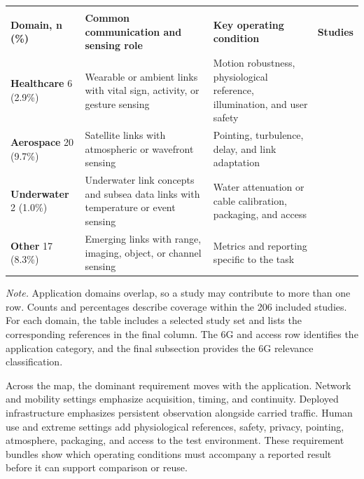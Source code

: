 \begin{table}[!t]
\vspace{3pt}
\begin{tabularx}{\textwidth}{@{}
>{\raggedright\arraybackslash}p{}
>{\raggedright\arraybackslash}p{}
>{\raggedright\arraybackslash}X
>{\centering\arraybackslash}p{}@{}}
\toprule
\multicolumn{4}{@{}l}{\emph{Human use, extreme settings, and remaining domains}} \\
\addlinespace[1pt]
\textbf{Domain, n (\%)} & \textbf{Common communication and sensing role} &
\textbf{Key operating condition} & \textbf{Studies} \\
\midrule
\textbf{Healthcare} 6 (2.9\%) & Wearable or ambient links with vital sign,
activity, or gesture sensing & Motion robustness, physiological reference,
illumination, and user safety & \cite{OISAC_SCR00001,OISAC_SCR00376} \\
\addlinespace[1.25pt]
\textbf{Aerospace} 20 (9.7\%) & Satellite links with atmospheric or wavefront
sensing & Pointing, turbulence, delay, and link adaptation &
\cite{OISAC_SCR00456} \\
\addlinespace[1.25pt]
\textbf{Underwater} 2 (1.0\%) & Underwater link concepts and subsea data links
with temperature or event sensing & Water attenuation or cable calibration,
packaging, and access & \cite{OISAC_SCR00763,OISAC_SCR01095} \\
\addlinespace[1.25pt]
\textbf{Other} 17 (8.3\%) & Emerging links with range, imaging, object, or
channel sensing & Metrics and reporting specific to the task & \cite{OISAC_SCR00953} \\
\bottomrule
\end{tabularx}
\vspace{1pt}
\parbox{\textwidth}{\raggedright\footnotesize\emph{Note.} Application domains
overlap, so a study may contribute to more than one row. Counts and percentages
describe coverage within the 206 included studies. For each domain, the table
includes a selected study set and lists the corresponding references in the
final column. The 6G and access row identifies the application category, and
the final subsection provides the 6G relevance classification.\par}
\end{table}

Across the map, the dominant requirement moves with the application. Network
and mobility settings emphasize acquisition, timing, and continuity. Deployed
infrastructure emphasizes persistent observation alongside carried traffic.
Human use and extreme settings add physiological references, safety,
privacy, pointing, atmosphere, packaging, and access to the test environment.
These requirement bundles show which operating conditions must accompany a
reported result before it can support comparison or reuse.

